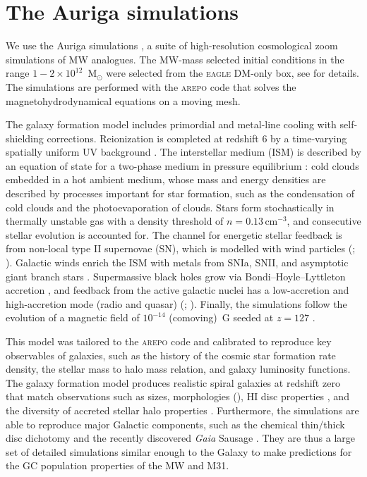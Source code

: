 \documentclass[a4paper,fleqn,usenatbib]{mnras}
\begin{document}
\section{The Auriga simulations}
\label{sec:auriga}
We use the Auriga simulations , a suite of 
high-resolution cosmological zoom simulations of MW analogues. The MW-mass
selected initial conditions in the range $1-2 \times 10^{12}$~M$_{\odot}$
were selected from the \mbox{\textsc{eagle}} DM-only box, see 
 for details. The simulations are 
performed with the \textsc{arepo} code \citep{2010MNRAS.401..791S, 2016MNRAS.455.1134P} 
that solves the magnetohydrodynamical equations on a moving mesh. 

The galaxy formation model includes primordial and metal-line cooling with 
self-shielding corrections. Reionization is completed at redshift $6$ by a
time-varying spatially uniform UV background \citep{2009ApJ...703.1416F, 
2013MNRAS.436.3031V}. The interstellar medium (ISM) is described by an equation of 
state for a two-phase medium in pressure equilibrium \citep{2003MNRAS.339..289S}: 
cold clouds embedded in a hot ambient medium, whose mass and energy densities
are described by processes important for star formation, such as the condensation 
of cold clouds and the photoevaporation of clouds. Stars form stochastically in 
thermally unstable gas with a density threshold of $n = 0.13 \, \text{cm}^{-3}$,
and consecutive stellar evolution is accounted for. The channel for energetic
stellar feedback is from non-local type II supernovae (SN), which is modelled 
with wind particles (\citealt{2014MNRAS.437.1750M}; ).
Galactic winds enrich the ISM with metals from SNIa, SNII, and asymptotic giant 
branch stars \citep{2013MNRAS.436.3031V}. Supermassive
black holes grow via Bondi–Hoyle–Lyttleton accretion \citep{1944MNRAS.104..273B,
1952MNRAS.112..195B}, and feedback from the active galactic nuclei has a low-accretion
and high-accretion mode (radio and quasar) (\citealt{2005MNRAS.361..776S, 
2014MNRAS.437.1750M}; ). Finally, the simulations 
follow the evolution of a magnetic field of $10^{-14}$ (comoving)~G seeded at 
$z = 127$ \citep{2013MNRAS.432..176P, 2014ApJ...783L..20P}.

This model was tailored to the \textsc{arepo} code and calibrated to reproduce
key observables of galaxies, such as the history of the cosmic star formation rate
density, the stellar mass to halo mass relation, and galaxy luminosity functions.
The galaxy formation model produces realistic spiral galaxies at redshift zero
that match observations such as sizes, morphologies (),
HI disc properties \citep{2017MNRAS.466.3859M}, and the diversity of accreted stellar
halo properties \citep{2019MNRAS.485.2589M}. Furthermore, the simulations are able to
reproduce major Galactic components, such as the chemical thin/thick disc dichotomy
\citep{2018MNRAS.474.3629G} and the recently discovered \textit{Gaia} Sausage 
\citep{2019MNRAS.484.4471F}. They are thus a large set of detailed simulations
similar enough to the Galaxy to make predictions for the GC population properties
of the MW and M31.
\end{document}
